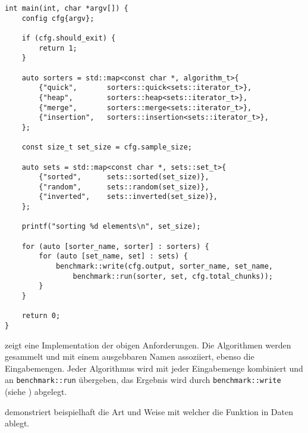 \begin{lstlisting}[label=lst:main, caption={Die \lstinline{main} Funktion des zur Ermittlung der praktischen Effizienz verwendeten Programms.}]
int main(int, char *argv[]) {
	config cfg{argv};

	if (cfg.should_exit) {
		return 1;
	}

	auto sorters = std::map<const char *, algorithm_t>{
		{"quick",       sorters::quick<sets::iterator_t>},
		{"heap",        sorters::heap<sets::iterator_t>},
		{"merge",       sorters::merge<sets::iterator_t>},
		{"insertion",   sorters::insertion<sets::iterator_t>},
	};

	const size_t set_size = cfg.sample_size;

	auto sets = std::map<const char *, sets::set_t>{
		{"sorted",      sets::sorted(set_size)},
		{"random",      sets::random(set_size)},
		{"inverted",    sets::inverted(set_size)},
	};

	printf("sorting %d elements\n", set_size);

	for (auto [sorter_name, sorter] : sorters) {
		for (auto [set_name, set] : sets) {
			benchmark::write(cfg.output, sorter_name, set_name,
				benchmark::run(sorter, set, cfg.total_chunks));
		}
	}

	return 0;
}
\end{lstlisting}

 zeigt eine Implementation der obigen Anforderungen. Die Algorithmen werden gesammelt und mit einem ausgebbaren Namen assoziiert, ebenso die Eingabemengen. Jeder Algorithmus wird mit jeder Eingabemenge kombiniert und an \lstinline{benchmark::run} übergeben, das Ergebnis wird durch \lstinline{benchmark::write} (siehe ) abgelegt.

 demonstriert beispielhaft die Art und Weise mit welcher die Funktion in  Daten ablegt.



